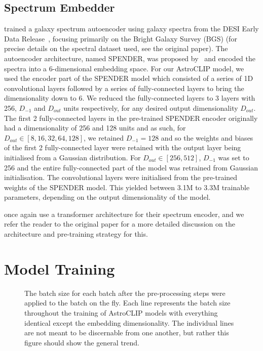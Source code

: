 \subsection{Spectrum Embedder}\label{subsec:spectrum-embedder}
\cite{liang2023} trained a galaxy spectrum autoencoder using galaxy spectra from the DESI Early Data Release~\citep{desiearly2023},
focusing primarily on the Bright Galaxy Survey (BGS) (for precise details on the spectral dataset used, see the original paper).
The autoencoder architecture, named SPENDER, was proposed by~\cite{melchior2022} and encoded the spectra into a 6-dimensional
embedding space.
For our AstroCLIP model, we used the encoder part of the SPENDER model which consisted of a series of 1D convolutional layers
followed by a series of fully-connected layers to bring the dimensionality down to 6.
We reduced the fully-connected layers to 3 layers with 256, $D_{-1}$ and $D_{out}$ units respectively, for any desired
output dimensionality $D_{out}$.
The first 2 fully-connected layers in the pre-trained SPENDER encoder originally had a dimensionality of 256 and 128 units
and as such, for $D_{out} \in [8, 16, 32, 64, 128]$, we retained $D_{-1}=128$ and so the weights and biases of the
first 2 fully-connected layer were retained with the output layer being initialised from a Gaussian distribution.
For $D_{out} \in [256, 512]$, $D_{-1}$ was set to 256 and the entire fully-connected part of the model was retrained
from Gaussian initialisation.
The convolutional layers were initialised from the pre-trained weights of the SPENDER model.
This yielded between 3.1M to 3.3M trainable parameters, depending on the output dimensionality of the model.

\cite{astroclip} once again use a transformer architecture for their spectrum encoder, and we refer the reader to the original
paper for a more detailed discussion on the architecture and pre-training strategy for this.

\section{Model Training}\label{sec:training}
\begin{figure}[t]
    \centering
    \caption{The batch size for each batch after the pre-processing steps were applied to the batch on the fly.
    Each line represents the batch size throughout the training of AstroCLIP models with everything identical except the
    embedding dimensionality.
    The individual lines are not meant to be discernable from one another, but rather this figure should show the general trend.}
    \label{fig:train_batch_size}
\end{figure}

